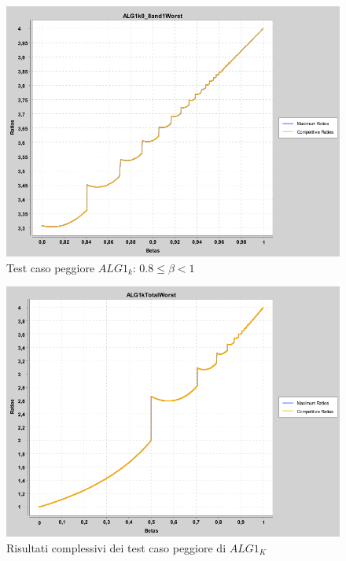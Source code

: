 \documentclass[12pt]{article}
\begin{document}
\begin{figure}[H]
\caption{Test caso peggiore $ALG1_{k}$: $0.8 \leq \beta < 1$}
\centering
\includegraphics[scale=0.4]{max/ALG1k0_8and1Worst.png}
\end{figure}
\begin{figure}[H]
\caption{Risultati complessivi dei test caso peggiore di $ALG1_{K}$}
\centering
\includegraphics[scale=0.4]{max/ALG1kTotalWorst.png}
\end{figure}
\end{document}

